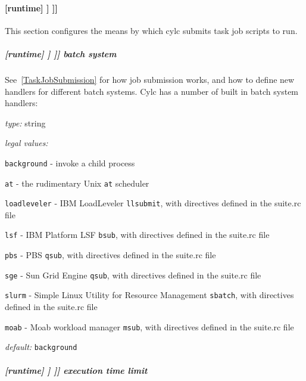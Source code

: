 \paragraph[{[[[}job{]]]}]{[runtime] \textrightarrow [[\_\_NAME\_\_]] \textrightarrow [[[job]]]}

This section configures the means by which cylc submits task job scripts to run.

\subparagraph[batch system]{[runtime] \textrightarrow [[\_\_NAME\_\_]] \textrightarrow [[[job]]] \textrightarrow batch system}
\label{RuntimeJobSubMethods}

See~\ref{TaskJobSubmission} for how job submission works, and how to define
new handlers for different batch systems. Cylc has a number of built in batch system handlers:
\begin{myitemize}
\item {\em type:} string
\item {\em legal values:}
   \begin{myitemize}
       \item \lstinline=background= - invoke a child process
       \item \lstinline=at= - the rudimentary Unix \lstinline=at= scheduler
       \item \lstinline=loadleveler= - IBM LoadLeveler \lstinline=llsubmit=, with directives defined in the suite.rc file
       \item \lstinline=lsf= - IBM Platform LSF \lstinline=bsub=, with directives defined in the suite.rc file
       \item \lstinline=pbs= - PBS \lstinline=qsub=, with directives defined in the suite.rc file
       \item \lstinline=sge= - Sun Grid Engine \lstinline=qsub=, with directives defined in the suite.rc file
       \item \lstinline=slurm= - Simple Linux Utility for Resource Management \lstinline=sbatch=, with directives defined in the suite.rc file
       \item \lstinline=moab= - Moab workload manager \lstinline=msub=, with directives defined in the suite.rc file
   \end{myitemize}
\item {\em default:} \lstinline=background=
\end{myitemize}

\subparagraph[execution time limit]{[runtime] \textrightarrow [[\_\_NAME\_\_]] \textrightarrow [[[job]]] \textrightarrow execution time limit}


